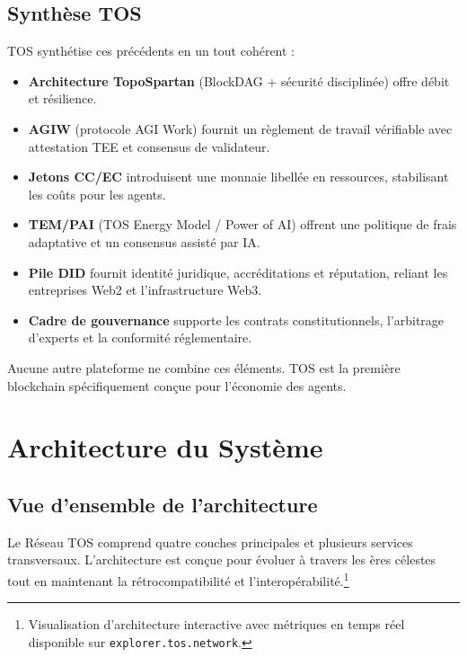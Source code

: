 \documentclass[11pt]{article}
\begin{document}
\subsection{Synthèse TOS}
TOS synthétise ces précédents en un tout cohérent :
\begin{itemize}[noitemsep]
  \item \textbf{Architecture TopoSpartan} (BlockDAG + sécurité disciplinée) offre débit et résilience.
  \item \textbf{AGIW} (protocole AGI Work) fournit un règlement de travail vérifiable avec attestation TEE et consensus de validateur.
  \item \textbf{Jetons CC/EC} introduisent une monnaie libellée en ressources, stabilisant les coûts pour les agents.
  \item \textbf{TEM/PAI} (TOS Energy Model / Power of AI) offrent une politique de frais adaptative et un consensus assisté par IA.
  \item \textbf{Pile DID} fournit identité juridique, accréditations et réputation, reliant les entreprises Web2 et l'infrastructure Web3.
  \item \textbf{Cadre de gouvernance} supporte les contrats constitutionnels, l'arbitrage d'experts et la conformité réglementaire.
\end{itemize}

Aucune autre plateforme ne combine ces éléments. TOS est la première blockchain spécifiquement conçue pour l'économie des agents.

\section{Architecture du Système}
\subsection{Vue d'ensemble de l'architecture}
Le Réseau TOS comprend quatre couches principales et plusieurs services transversaux. L'architecture est conçue pour évoluer à travers les ères célestes tout en maintenant la rétrocompatibilité et l'interopérabilité.\footnote{Visualisation d'architecture interactive avec métriques en temps réel disponible sur \texttt{explorer.tos.network}.}
\end{document}
